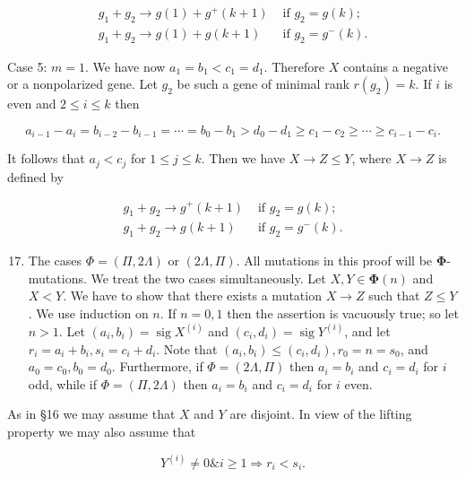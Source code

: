 \documentclass[10pt]{article}
\begin{document}
$$
\begin{array}{ll}
g_{1}+g_{2} \rightarrow g(1)+g^{+}(k+1) & \text { if } g_{2}=g(k) ; \\
g_{1}+g_{2} \rightarrow g(1)+g(k+1) & \text { if } g_{2}=g^{-}(k) .
\end{array}
$$

Case 5: $m=1$. We have now $a_{1}=b_{1}<c_{1}=d_{1}$. Therefore $X$ contains a negative or a nonpolarized gene. Let $g_{2}$ be such a gene of minimal rank $r\left(g_{2}\right)=k$. If $i$ is even and $2 \leqslant i \leqslant k$ then

$$
a_{i-1}-a_{i}=b_{i-2}-b_{i-1}=\cdots=b_{0}-b_{1}>d_{0}-d_{1} \geqslant c_{1}-c_{2} \geqslant \cdots \geqslant c_{i-1}-c_{i} .
$$

It follows that $a_{j}<c_{j}$ for $1 \leqslant j \leqslant k$. Then we have $X \rightarrow Z \leqslant Y$, where $X \rightarrow Z$ is defined by

$$
\begin{array}{ll}
g_{1}+g_{2} \rightarrow g^{+}(k+1) & \text { if } g_{2}=g(k) ; \\
g_{1}+g_{2} \rightarrow g(k+1) & \text { if } g_{2}=g^{-}(k) .
\end{array}
$$

\begin{enumerate}
  \setcounter{enumi}{16}
  \item The cases $\Phi=(\Pi, 2 \Lambda)$ or $(2 \Lambda, \Pi)$. All mutations in this proof will be $\boldsymbol{\Phi}$-mutations. We treat the two cases simultaneously. Let $X, Y \in \boldsymbol{\Phi}(n)$ and $X<Y$. We have to show that there exists a mutation $X \rightarrow Z$ such that $Z \leqslant Y$. We use induction on $n$. If $n=0,1$ then the assertion is vacuously true; so let $n>1$. Let $\left(a_{i}, b_{i}\right)=\operatorname{sig} X^{(i)}$ and $\left(c_{i}, d_{i}\right)=\operatorname{sig} Y^{(i)}$, and let $r_{i}=a_{i}+b_{i}, s_{i}=c_{i}+d_{i}$. Note that $\left(a_{i}, b_{i}\right) \leqslant\left(c_{i}, d_{i}\right), r_{0}=n=s_{0}$, and $a_{0}=c_{0}, b_{0}=d_{0}$. Furthermore, if $\Phi=(2 \Lambda, \Pi)$ then $a_{i}=b_{i}$ and $c_{i}=d_{i}$ for $i$ odd, while if $\Phi=(\Pi, 2 \Lambda)$ then $a_{i}=b_{i}$ and $c_{i}=d_{i}$ for $i$ even.
\end{enumerate}

As in §16 we may assume that $X$ and $Y$ are disjoint. In view of the lifting property we may also assume that


\begin{equation*}
Y^{(i)} \neq 0 \& i \geqslant 1 \Rightarrow r_{i}<s_{i} . \tag{17.1}
\end{equation*}
\end{document}
